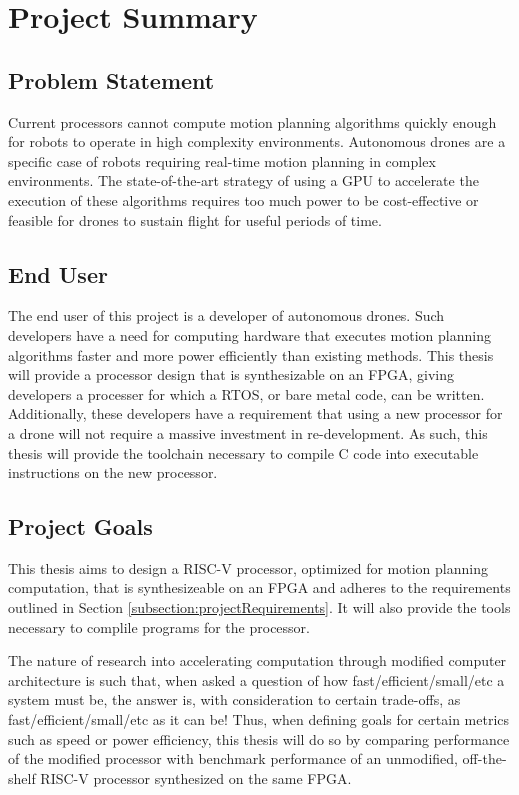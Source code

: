 
\section{Project Summary}

\subsection{Problem Statement}
Current processors cannot compute motion planning algorithms quickly enough for robots to operate in high complexity environments. Autonomous drones are a specific case of robots requiring real-time motion planning in complex environments. The state-of-the-art strategy of using a \ac{GPU} to accelerate the execution of these algorithms requires too much power to be cost-effective or feasible for drones to sustain flight for useful periods of time.

\subsection{End User}
The end user of this project is a developer of autonomous drones. Such developers have a need for computing hardware that executes motion planning algorithms faster and more power efficiently than existing methods. This thesis will provide a processor design that is synthesizable on an \ac{FPGA}, giving developers a processer for which a \ac{RTOS}, or bare metal code, can be written. 
Additionally, these developers have a requirement that using a new processor for a drone will not require a massive investment in re-development. As such, this thesis will provide the toolchain necessary to compile C code into executable instructions on the new processor.

\subsection{Project Goals} \label{subsection:projectGoals}
This thesis aims to design a RISC-V processor, optimized for motion planning computation, that is synthesizeable on an \ac{FPGA} and adheres to the requirements outlined in Section \ref{subsection:projectRequirements}. It will also provide the tools necessary to complile programs for the processor. 

The nature of research into accelerating computation through modified computer architecture is such that, when asked a question of how fast/efficient/small/etc a system must be, the answer is, with consideration to certain trade-offs, as fast/efficient/small/etc as it can be! Thus, when defining goals for certain metrics such as speed or power efficiency, this thesis will do so by comparing performance of the modified processor with benchmark performance of an unmodified, off-the-shelf RISC-V processor synthesized on the same \ac{FPGA}.

